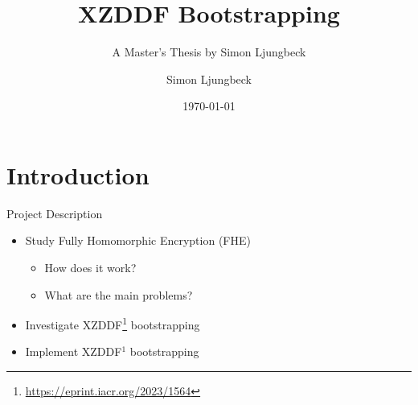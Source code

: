 \documentclass[aspectratio=169]{beamer}
\title[XZDDF Bootstrapping]{XZDDF Bootstrapping}
\author{Simon Ljungbeck}
\subtitle{A Master's Thesis by Simon Ljungbeck}
\date{\today}
\institute{Lund University\\Department of Electrical and Information Technology}
\begin{document}
\titleframe


\section{Introduction}

\begin{frame}{Project Description}
    \begin{itemize}
        \item Study Fully Homomorphic Encryption (FHE)
        \begin{itemize}
            \item How does it work?
            \item What are the main problems?
        \end{itemize}
    \end{itemize}
    \begin{itemize}
        \item Investigate XZDDF\footnote[frame]{\label{xzddf_paper} \url{https://eprint.iacr.org/2023/1564}} bootstrapping
    \end{itemize}
    \begin{itemize}
        \item Implement XZDDF$^1$ bootstrapping
    \end{itemize}
\end{frame}
\end{document}
